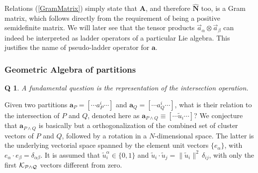 \documentclass[twocolumn,aps,sort,nofootinbib]{revtex4}
\newtheorem{question}{Q}
\begin{document}
Relations (\ref{GramMatrix}) simply state that $\mathbf{A}$, and therefore $\mathbf{\hat{N}}$ too, is
a Gram matrix, which follows directly from the requirement of being a positive semidefinite matrix.
We will later see that the tensor products $\overrightarrow{a}_\alpha\otimes \overrightarrow{a}_\beta$
can indeed be interpreted as ladder operators of a particular Lie algebra. This justifies the name of
pseudo-ladder operator for $\mathbf{a}$.

\subsubsection{Geometric Algebra of partitions}
\begin{question}
A fundamental question is the representation of the intersection operation.
\end{question}
Given two partitions $\mathbf{a}_P=\left[\cdots a^i_P\cdots\right]$
and $\mathbf{a}_Q=\left[\cdots a^i_Q\cdots\right]$, 
what is their relation to
the intersection of $P$ and $Q$, denoted here as 
$\mathbf{a}_{P\wedge Q}\equiv \left[\cdots \tilde{u}_i\cdots\right]$?
We conjecture that $\mathbf{a}_{P\wedge Q}$ is basically but
a orthogonalization of the combined set of cluster vectors
of $P$ and $Q$, followed
by a rotation in a $N$-dimensional space. The latter is
the underlying vectorial space spanned by the element unit
vectors $\{e_\alpha\}$, with $e_\alpha\cdot e_\beta = \delta_{\alpha\beta}$.
It is assumed that $\tilde{u}_i^\alpha \in \{0,1\}$ and  
$\tilde{u}_i\cdot \tilde{u}_j = \|\tilde{u}_i\|^2\,\delta_{ij}$,
with only the first $\cal{K}_{P\wedge Q}$ vectors different from zero.
\end{document}
